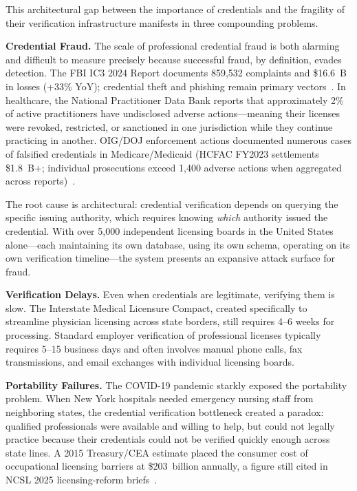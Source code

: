\documentclass[conference,10pt]{IEEEtran}
\begin{document}
This architectural gap between the importance of credentials and the fragility of their verification infrastructure manifests in three compounding problems.

\textbf{Credential Fraud.} The scale of professional credential fraud is both alarming and difficult to measure precisely because successful fraud, by definition, evades detection. The FBI IC3 2024 Report documents 859,532 complaints and \$16.6~B in losses (+33\% YoY); credential theft and phishing remain primary vectors~\cite{fbiic32024}. In healthcare, the National Practitioner Data Bank reports that approximately 2\% of active practitioners have undisclosed adverse actions---meaning their licenses were revoked, restricted, or sanctioned in one jurisdiction while they continue practicing in another. OIG/DOJ enforcement actions documented numerous cases of falsified credentials in Medicare/Medicaid (HCFAC FY2023 settlements \$1.8~B+; individual prosecutions exceed 1,400 adverse actions when aggregated across reports)~\cite{oighcfac2023}.

The root cause is architectural: credential verification depends on querying the specific issuing authority, which requires knowing \emph{which} authority issued the credential. With over 5,000 independent licensing boards in the United States alone---each maintaining its own database, using its own schema, operating on its own verification timeline---the system presents an expansive attack surface for fraud.

\textbf{Verification Delays.} Even when credentials are legitimate, verifying them is slow. The Interstate Medical Licensure Compact, created specifically to streamline physician licensing across state borders, still requires 4--6 weeks for processing. Standard employer verification of professional licenses typically requires 5--15 business days and often involves manual phone calls, fax transmissions, and email exchanges with individual licensing boards.

\textbf{Portability Failures.} The COVID-19 pandemic starkly exposed the portability problem. When New York hospitals needed emergency nursing staff from neighboring states, the credential verification bottleneck created a paradox: qualified professionals were available and willing to help, but could not legally practice because their credentials could not be verified quickly enough across state lines. A 2015 Treasury/CEA estimate placed the consumer cost of occupational licensing barriers at \$203~billion annually, a figure still cited in NCSL 2025 licensing-reform briefs~\cite{ncsl2024}.
\end{document}
